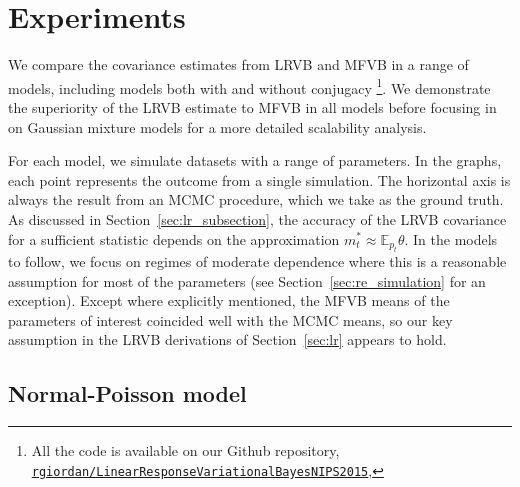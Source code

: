 \documentclass{article}\usepackage[]{graphicx}\usepackage[]{color}
\newcommand{\mysec}[1]{Section~\ref{sec:#1}}
\newcommand{\mpopt}{m^*} %
\theoremstyle{plain}
\newcommand{\mbe}{\mathbb{E}}
\begin{document}
\section{Experiments} \label{sec:experiments}

We compare the covariance estimates from LRVB and MFVB in a range of models,
including models both with and without conjugacy
\footnote{All the code is available on our Github repository,
\href{https://github.com/rgiordan/LinearResponseVariationalBayesNIPS2015}{\texttt{rgiordan/LinearResponseVariationalBayesNIPS2015}},
}.
We demonstrate the superiority
of the LRVB estimate to MFVB in all models before focusing in on Gaussian
mixture models for a more detailed scalability analysis.

For each model, we simulate datasets with a range of parameters.  In the graphs,
each point represents the outcome from a single simulation.  The horizontal axis
is always the result from an MCMC procedure, which we take as the ground truth.
As discussed in \mysec{lr_subsection}, the accuracy of the LRVB covariance for a
sufficient statistic depends on the approximation $\mpopt_t \approx \mbe_{p_t}
\theta$. In the models to follow, we focus on regimes of moderate dependence
where this is a reasonable assumption for most of the parameters (see
\mysec{re_simulation} for an exception). Except where explicitly mentioned, the
MFVB means of the parameters of interest coincided well with the MCMC means, so
our key assumption in the LRVB derivations of \mysec{lr} appears to hold.

\subsection{Normal-Poisson model} \label{sec:normal_poisson_model}
\end{document}
